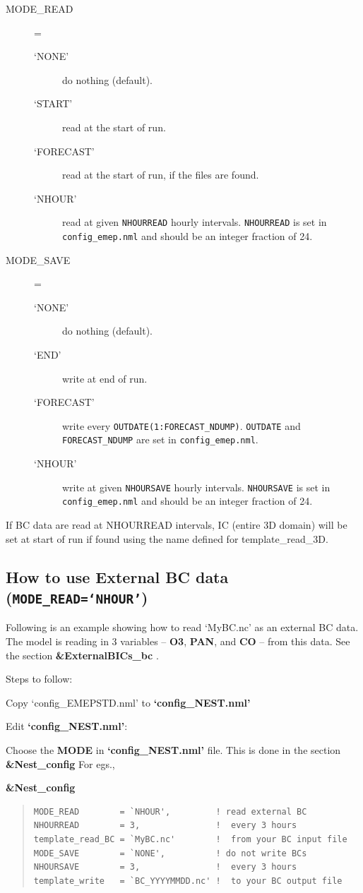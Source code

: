 \documentclass[a4paper,12pt]{report}
\begin{document}
\begin{description}
\item[MODE\_READ]=
  \begin{description}
  \item[`NONE']  do nothing (default).
  \item[`START'] read at the start of run.
  \item[`FORECAST']  read at the start of run, if the files are found.
  \item[`NHOUR'] read at given {\tt NHOURREAD} hourly intervals. {\tt NHOURREAD} is set in {\tt config\_emep.nml} and should be an integer fraction of 24.
  \end{description}
\item[MODE\_SAVE]=
  \begin{description}
  \item[`NONE']  do nothing (default).
  \item[`END'] write at end of run.
  \item[`FORECAST'] write every {\tt OUTDATE(1:FORECAST\_NDUMP)}.
   {\tt OUTDATE} and {\tt FORECAST\_NDUMP} are set in {\tt config\_emep.nml}.
  \item[`NHOUR'] write at given {\tt NHOURSAVE} hourly intervals. {\tt NHOURSAVE} is set in {\tt config\_emep.nml} and should be an integer fraction of 24.
  \end{description}
\end{description}
If BC data are read at NHOURREAD intervals, IC (entire 3D domain) will be set at start of run if found using the name defined for template\_read\_3D.


\subsection{How to use External BC data ({\tt MODE\_READ=`NHOUR'})}

Following is an example showing how to read `MyBC.nc' as an external BC data.  
The model is reading in 3 variables – {\bf O3}, {\bf PAN}, and {\bf CO} – from this data.  See the 	section {\bf \&ExternalBICs\_bc} . 

Steps to follow: 

	Copy `config\_EMEPSTD.nml' to {\bf `config\_NEST.nml'} 

	Edit {\bf `config\_NEST.nml'}:	

	Choose the {\bf MODE} in {\bf `config\_NEST.nml'} file. This is done in the section {\bf \&Nest\_config}
For egs.,

{\bf \&Nest\_config}
\begin{quote}
\begin{verbatim}
MODE_READ        = `NHOUR',         ! read external BC 
NHOURREAD        = 3,               !  every 3 hours
template_read_BC = `MyBC.nc'        !  from your BC input file
MODE_SAVE        = `NONE',          ! do not write BCs
NHOURSAVE        = 3,               !  every 3 hours
template_write   = `BC_YYYYMMDD.nc' !  to your BC output file
\end{verbatim}
\end{quote}
\end{document}
